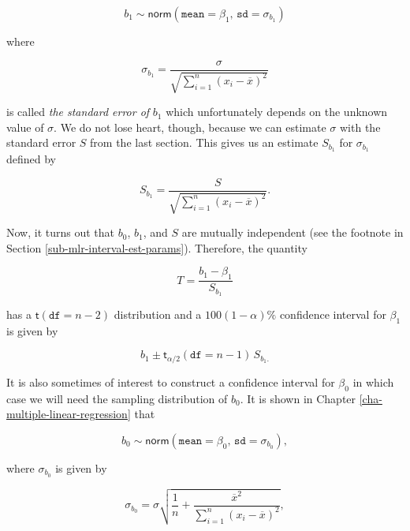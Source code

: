 \documentclass[]{book}
\numberwithin{equation}{chapter}
\numberwithin{figure}{chapter}
\theoremstyle{plain}
\theoremstyle{definition}
\theoremstyle{remark}
\theoremstyle{definition}
\theoremstyle{definition}
\theoremstyle{remark}
\begin{document}
\begin{equation}
b_{1}\sim\mathsf{norm}\left(\mathtt{mean}=\beta_{1},\,\mathtt{sd}=\sigma_{b_{1}}\right)
\end{equation}

where

\begin{equation}
\sigma_{b_{1}}=\frac{\sigma}{\sqrt{\sum_{i=1}^{n}(x_{i}-\overline{x})^{2}}}
\end{equation}

is called \emph{the standard error of} \(b_{1}\) which unfortunately
depends on the unknown value of \(\sigma\). We do not lose heart,
though, because we can estimate \(\sigma\) with the standard error \(S\)
from the last section. This gives us an estimate \(S_{b_{1}}\) for
\(\sigma_{b_{1}}\) defined by

\begin{equation}
S_{b_{1}}=\frac{S}{\sqrt{\sum_{i=1}^{n}(x_{i}-\overline{x})^{2}}}.
\end{equation}

Now, it turns out that \(b_{0}\), \(b_{1}\), and \(S\) are mutually
independent (see the footnote in Section
\ref{sub-mlr-interval-est-params}). Therefore, the quantity

\begin{equation}
T=\frac{b_{1}-\beta_{1}}{S_{b_{1}}}
\end{equation}

has a \(\mathsf{t}(\mathtt{df}=n-2)\) distribution and a
\(100(1-\alpha)\%\) confidence interval for \(\beta_{1}\) is given by

\begin{equation}
b_{1}\pm\mathsf{t}_{\alpha/2}(\mathtt{df}=n-1)\, S_{b_{1}.}
\end{equation}

It is also sometimes of interest to construct a confidence interval for
\(\beta_{0}\) in which case we will need the sampling distribution of
\(b_{0}\). It is shown in Chapter \ref{cha-multiple-linear-regression}
that

\begin{equation}
b_{0}\sim\mathsf{norm}\left(\mathtt{mean}=\beta_{0},\,\mathtt{sd}=\sigma_{b_{0}}\right),
\end{equation}

where \(\sigma_{b_{0}}\) is given by

\begin{equation}
\sigma_{b_{0}}=\sigma\sqrt{\frac{1}{n}+\frac{\overline{x}^{2}}{\sum_{i=1}^{n}(x_{i}-\overline{x})^{2}}},
\end{equation}
\end{document}
